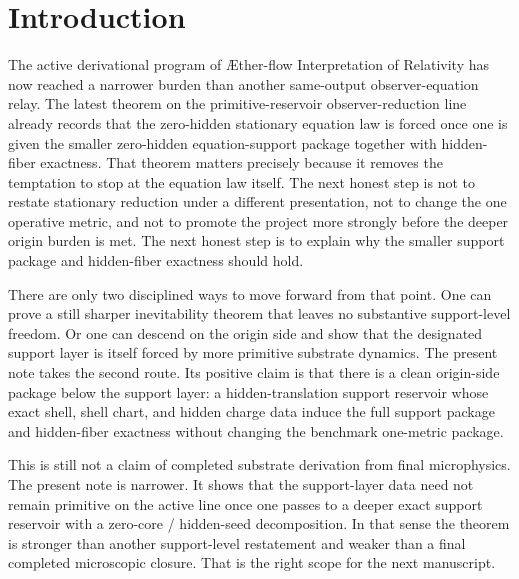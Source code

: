 \documentclass[11pt]{article}
\newcommand{\Aflow}{\AE{}ther-flow}
\newcommand{\TheoryName}{\Aflow{} Interpretation of Relativity}
\begin{document}
\section{Introduction}

The active derivational program of \TheoryName{} has now reached a narrower burden than another same-output observer-equation relay. The latest theorem on the primitive-reservoir observer-reduction line already records that the zero-hidden stationary equation law is forced once one is given the smaller zero-hidden equation-support package together with hidden-fiber exactness. That theorem matters precisely because it removes the temptation to stop at the equation law itself. The next honest step is not to restate stationary reduction under a different presentation, not to change the one operative metric, and not to promote the project more strongly before the deeper origin burden is met. The next honest step is to explain why the smaller support package and hidden-fiber exactness should hold.

There are only two disciplined ways to move forward from that point. One can prove a still sharper inevitability theorem that leaves no substantive support-level freedom. Or one can descend on the origin side and show that the designated support layer is itself forced by more primitive substrate dynamics. The present note takes the second route. Its positive claim is that there is a clean origin-side package below the support layer: a hidden-translation support reservoir whose exact shell, shell chart, and hidden charge data induce the full support package and hidden-fiber exactness without changing the benchmark one-metric package.

This is still not a claim of completed substrate derivation from final microphysics. The present note is narrower. It shows that the support-layer data need not remain primitive on the active line once one passes to a deeper exact support reservoir with a zero-core / hidden-seed decomposition. In that sense the theorem is stronger than another support-level restatement and weaker than a final completed microscopic closure. That is the right scope for the next manuscript.
\end{document}
